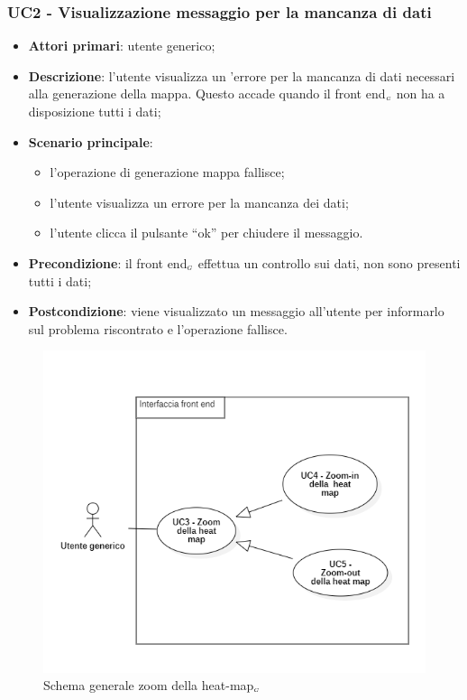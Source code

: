 \subsubsection{UC2 - Visualizzazione messaggio per la mancanza di dati }\label{CasiDUsoCasiDUsoTraUnUtenteEIlFrontEndElencoCasiDUsoUC2VisualizzazioneMessaggioPerLaMancanzaDiDati} %
\begin{itemize}
	\item \textbf{Attori primari}: utente generico;
	\item \textbf{Descrizione}: l’utente visualizza un  ’errore per la mancanza di dati necessari alla generazione della mappa. Questo accade quando il front end$_{\scaleto{G}{3pt}}$ non ha a disposizione tutti i dati;
	\item \textbf{Scenario principale}:
	\begin{itemize}
		\item l’operazione di generazione mappa fallisce;
		\item l’utente visualizza un errore per la mancanza dei dati;
		\item l’utente clicca il pulsante “ok” per chiudere il messaggio.
	\end{itemize}
	\item \textbf{Precondizione}: il front end$_{\scaleto{G}{3pt}}$ effettua un controllo sui dati, non sono presenti tutti i dati;
	\item \textbf{Postcondizione}: viene visualizzato un messaggio all’utente per informarlo sul problema riscontrato e l’operazione fallisce.
\end{itemize}


\begin{center}
	\begin{figure}[H]
		\centering\includegraphics[scale=0.8]{../immagini/attori_casi/UC3-4-5.png}
		\caption{Schema generale zoom della heat-map$_{\scaleto{G}{3pt}}$}
	\end{figure}
\end{center}


